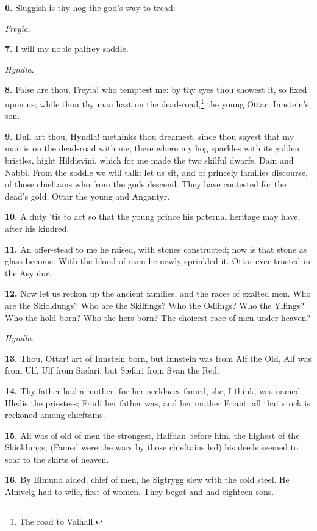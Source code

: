 \textbf{6.} Sluggish is thy hog the god's way to tread:

\emph{Freyia}.

\textbf{7.} I will my noble palfrey saddle.

\emph{Hyndla}.

\textbf{8.} False are thou, Freyia! who temptest me: by thy eyes thou showest
it, so fixed upon us; while thou thy man hast on the dead-road,\footnote{The road to Valhall.}
the young Ottar, Innstein's son.

\textbf{9.} Dull art thou, Hyndla! methinks thou dreamest, since thou sayest
that my man is on the dead-road with me; there where my hog sparkles
with its golden bristles, hight Hildisvini, which for me made the two
skilful dwarfs, Dain and Nabbi. From the saddle we will talk: let us
sit, and of princely families discourse, of those chieftains who from
the gods descend. They have contested for the dead's gold, Ottar the
young and Angantyr.

\textbf{10.} A duty 'tis to act so that the young prince his paternal
heritage may have, after his kindred.

\textbf{11.} An offer-stead to me he raised, with stones constructed; now is
that stone as glass become. With the blood of oxen he newly sprinkled
it. Ottar ever trusted in the Asyniur.

\textbf{12.} Now let us reckon up the ancient families, and the races of
exalted men. Who are the Skioldungs? Who are the Skilfings? Who the
Odlings? Who the Ylfings? Who the hold-born? Who the hers-born? The
choicest race of men under heaven?

\emph{Hyndla}.

\textbf{13.} Thou, Ottar! art of Innstein born, but Innstein was from Alf the
Old, Alf was from Ulf, Ulf from Sæfari, but Sæfari from Svan the Red.

\textbf{14.} Thy father had a mother, for her necklaces famed, she, I think,
was named Hledis the priestess; Frodi her father was, and her mother
Friant: all that stock is reckoned among chieftains.

\textbf{15.} Ali was of old of men the strongest, Halfdan before him, the
highest of the Skioldungs; (Famed were the wars by those chieftains
led) his deeds seemed to soar to the skirts of heaven.

\textbf{16.} By Eimund aided, chief of men, he Sigtrygg slew with the cold
steel. He Almveig had to wife, first of women. They begat and had
eighteen sons.

